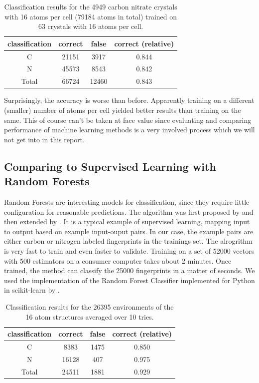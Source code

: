 \begin{table}[h!]
\center
\begin{tabular}{c|c|c|c}
classification & correct & false & correct (relative) \\ \hline
C              & 21151   & 3917  & 0.844              \\ \hline
N              & 45573   & 8543  & 0.842              \\ \hline
Total          & 66724   & 12460  & 0.843             
\end{tabular}
\caption{Classification results for the 4949 carbon nitrate crystals with 16 atoms per cell (79184 atoms in total) trained on 63 crystals with 16 atoms per cell.}
\label{table:res2}
\end{table}

Surprisingly, the accuracy is worse than before. Apparently training on a different (smaller) number of atoms per cell yielded better results than training on the same. This of course can't be taken at face value since evaluating and comparing performance of machine learning methods is a very involved process which we will not get into in this report.



\subsection{Comparing to Supervised Learning with Random Forests}
Random Forests are interesting models for classification, since they require little configuration for reasonable predictions. The algorithm was first proposed by \citeauthor{Ho1995} \cite{Ho1995} and then extended by \citeauthor{Breiman2001} \cite{Breiman2001}. It is a typical example of supervised learning, mapping input to output based on example input-ouput pairs. In our case, the example pairs are either carbon or nitrogen labeled fingerprints in the trainings set.
The alrogrithm is very fast to train and even faster to validate. Training on a set of 52000 vectors with 500 estimators on a consumer computer takes about 2 minutes. Once trained, the method can classify the 25000 fingerprints in a matter of seconds. We used the implementation of the Random Forest Classifier implemented for Python in scikit-learn by \citeauthor{scikit} \cite{scikit}. 

\begin{table}[h!]
\center
\begin{tabular}{c|c|c|c}
classification & correct & false & correct (relative) \\ \hline
C              & 8383   & 1475  & 0.850              \\ \hline
N              & 16128   & 407  & 0.975              \\ \hline
Total          & 24511   & 1881  & 0.929             
\end{tabular}
\caption{Classification results for the 26395 environments of the 16 atom structures averaged over 10 tries.}
\label{table:res3}
\end{table}

